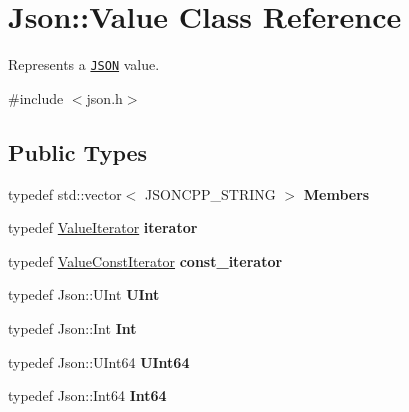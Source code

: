 \hypertarget{classJson_1_1Value}{}\section{Json\+:\+:Value Class Reference}
\label{classJson_1_1Value}


Represents a \href{http://www.json.org}{\tt J\+S\+ON} value.  




{\ttfamily \#include $<$json.\+h$>$}

\subsection*{Public Types}
\begin{DoxyCompactItemize}
\item 
typedef std\+::vector$<$ J\+S\+O\+N\+C\+P\+P\+\_\+\+S\+T\+R\+I\+NG $>$ {\bfseries Members}\hypertarget{classJson_1_1Value_a9ae9069983fc38f1928d76f9c79ac64d}{}\label{classJson_1_1Value_a9ae9069983fc38f1928d76f9c79ac64d}

\item 
typedef \hyperlink{classJson_1_1ValueIterator}{Value\+Iterator} {\bfseries iterator}\hypertarget{classJson_1_1Value_a341cdf2e01f8b3c5b7317aa2f0768c53}{}\label{classJson_1_1Value_a341cdf2e01f8b3c5b7317aa2f0768c53}

\item 
typedef \hyperlink{classJson_1_1ValueConstIterator}{Value\+Const\+Iterator} {\bfseries const\+\_\+iterator}\hypertarget{classJson_1_1Value_af92282ca92b58b320debd486afb7696a}{}\label{classJson_1_1Value_af92282ca92b58b320debd486afb7696a}

\item 
typedef Json\+::\+U\+Int {\bfseries U\+Int}\hypertarget{classJson_1_1Value_a0933d59b45793ae4aade1757c322a98d}{}\label{classJson_1_1Value_a0933d59b45793ae4aade1757c322a98d}

\item 
typedef Json\+::\+Int {\bfseries Int}\hypertarget{classJson_1_1Value_abdf7a7ff73eb130ffcab28504ffdb405}{}\label{classJson_1_1Value_abdf7a7ff73eb130ffcab28504ffdb405}

\item 
typedef Json\+::\+U\+Int64 {\bfseries U\+Int64}\hypertarget{classJson_1_1Value_a8b62564be8c087c6d18de180ff4e13e3}{}\label{classJson_1_1Value_a8b62564be8c087c6d18de180ff4e13e3}

\item 
typedef Json\+::\+Int64 {\bfseries Int64}\hypertarget{classJson_1_1Value_a1b86af9f85f0f1baa972c3319fa22695}{}\label{classJson_1_1Value_a1b86af9f85f0f1baa972c3319fa22695}


\end{DoxyCompactItemize}
